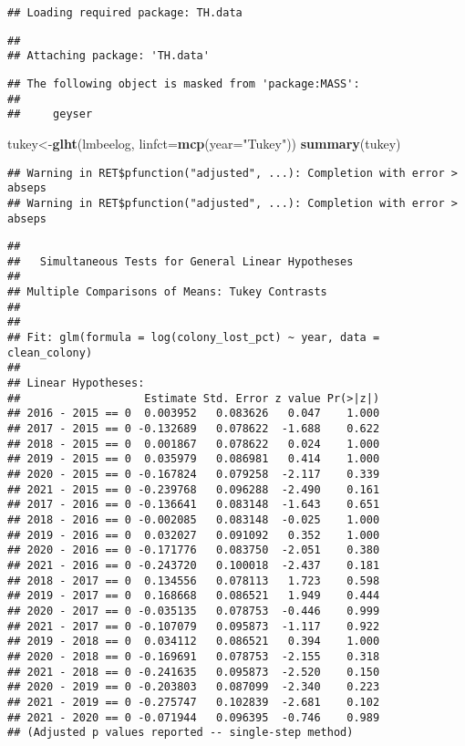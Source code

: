 \documentclass[
]{article}
\newenvironment{Shaded}{\begin{snugshade}}{\end{snugshade}}
\newcommand{\AttributeTok}[1]{\textcolor[rgb]{0.13,0.29,0.53}{#1}}
\newcommand{\FunctionTok}[1]{\textcolor[rgb]{0.13,0.29,0.53}{\textbf{#1}}}
\newcommand{\NormalTok}[1]{#1}
\newcommand{\OtherTok}[1]{\textcolor[rgb]{0.56,0.35,0.01}{#1}}
\newcommand{\StringTok}[1]{\textcolor[rgb]{0.31,0.60,0.02}{#1}}
\begin{document}
\begin{verbatim}
## Loading required package: TH.data
\end{verbatim}

\begin{verbatim}
## 
## Attaching package: 'TH.data'
\end{verbatim}

\begin{verbatim}
## The following object is masked from 'package:MASS':
## 
##     geyser
\end{verbatim}

\begin{Shaded}
\begin{Highlighting}[]
\NormalTok{tukey}\OtherTok{\textless{}{-}}\FunctionTok{glht}\NormalTok{(lmbeelog, }\AttributeTok{linfct=}\FunctionTok{mcp}\NormalTok{(}\AttributeTok{year=}\StringTok{"Tukey"}\NormalTok{))}
\FunctionTok{summary}\NormalTok{(tukey)}
\end{Highlighting}
\end{Shaded}

\begin{verbatim}
## Warning in RET$pfunction("adjusted", ...): Completion with error > abseps
## Warning in RET$pfunction("adjusted", ...): Completion with error > abseps
\end{verbatim}

\begin{verbatim}
## 
##   Simultaneous Tests for General Linear Hypotheses
## 
## Multiple Comparisons of Means: Tukey Contrasts
## 
## 
## Fit: glm(formula = log(colony_lost_pct) ~ year, data = clean_colony)
## 
## Linear Hypotheses:
##                   Estimate Std. Error z value Pr(>|z|)
## 2016 - 2015 == 0  0.003952   0.083626   0.047    1.000
## 2017 - 2015 == 0 -0.132689   0.078622  -1.688    0.622
## 2018 - 2015 == 0  0.001867   0.078622   0.024    1.000
## 2019 - 2015 == 0  0.035979   0.086981   0.414    1.000
## 2020 - 2015 == 0 -0.167824   0.079258  -2.117    0.339
## 2021 - 2015 == 0 -0.239768   0.096288  -2.490    0.161
## 2017 - 2016 == 0 -0.136641   0.083148  -1.643    0.651
## 2018 - 2016 == 0 -0.002085   0.083148  -0.025    1.000
## 2019 - 2016 == 0  0.032027   0.091092   0.352    1.000
## 2020 - 2016 == 0 -0.171776   0.083750  -2.051    0.380
## 2021 - 2016 == 0 -0.243720   0.100018  -2.437    0.181
## 2018 - 2017 == 0  0.134556   0.078113   1.723    0.598
## 2019 - 2017 == 0  0.168668   0.086521   1.949    0.444
## 2020 - 2017 == 0 -0.035135   0.078753  -0.446    0.999
## 2021 - 2017 == 0 -0.107079   0.095873  -1.117    0.922
## 2019 - 2018 == 0  0.034112   0.086521   0.394    1.000
## 2020 - 2018 == 0 -0.169691   0.078753  -2.155    0.318
## 2021 - 2018 == 0 -0.241635   0.095873  -2.520    0.150
## 2020 - 2019 == 0 -0.203803   0.087099  -2.340    0.223
## 2021 - 2019 == 0 -0.275747   0.102839  -2.681    0.102
## 2021 - 2020 == 0 -0.071944   0.096395  -0.746    0.989
## (Adjusted p values reported -- single-step method)
\end{verbatim}
\end{document}
